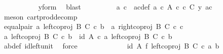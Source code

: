 \begin{isabellebody}
\ \ \ \ \ \ \ \ \isamarkupfalse%
\ \ y{\isacharunderscore}{\kern0pt}form\ \isamarkupfalse%
\ blast\isanewline
\ \ \ \ \ \ \isamarkupfalse%
\ \isamarkupfalse%
\ a{\isacharprime}{\kern0pt}\ c{\isacharprime}{\kern0pt}\ \ a{\isacharprime}{\kern0pt}c{\isacharprime}{\kern0pt}{\isacharunderscore}{\kern0pt}def{\isacharcolon}{\kern0pt}\ {\isachardoublequoteopen}a{\isacharprime}{\kern0pt}\ {\isasymin}\isactrlsub c\ A{\isachardoublequoteclose}\ {\isachardoublequoteopen}c{\isacharprime}{\kern0pt}\ {\isasymin}\isactrlsub c\ C{\isachardoublequoteclose}\ {\isachardoublequoteopen}y{\isacharprime}{\kern0pt}\ {\isacharequal}{\kern0pt}{\isasymlangle}a{\isacharprime}{\kern0pt}{\isacharcomma}{\kern0pt}c{\isacharprime}{\kern0pt}{\isasymrangle}{\isachardoublequoteclose}\isanewline
\ \ \ \ \ \ \ \ \isamarkupfalse%
\ {\isacharparenleft}{\kern0pt}meson\ cart{\isacharunderscore}{\kern0pt}prod{\isacharunderscore}{\kern0pt}decomp{\isacharparenright}{\kern0pt}\isanewline
\ \ \ \ \ \ \isamarkupfalse%
\ equal{\isacharunderscore}{\kern0pt}pair{\isacharcolon}{\kern0pt}\ {\isachardoublequoteopen}{\isasymlangle}a{\isacharcomma}{\kern0pt}\ {\isacharparenleft}{\kern0pt}left{\isacharunderscore}{\kern0pt}coproj\ B\ C{\isacharparenright}{\kern0pt}\ {\isasymcirc}\isactrlsub c\ b{\isasymrangle}\ {\isacharequal}{\kern0pt}\ {\isasymlangle}a{\isacharprime}{\kern0pt}{\isacharcomma}{\kern0pt}\ right{\isacharunderscore}{\kern0pt}coproj\ B\ C\ {\isasymcirc}\isactrlsub c\ c{\isacharprime}{\kern0pt}{\isasymrangle}{\isachardoublequoteclose}\isanewline
\ \ \ \ \ \ \isamarkupfalse%
\ {\isacharminus}{\kern0pt}\ \isanewline
\ \ \ \ \ \ \ \ \isamarkupfalse%
\ {\isachardoublequoteopen}{\isasymlangle}a{\isacharcomma}{\kern0pt}\ left{\isacharunderscore}{\kern0pt}coproj\ B\ C\ {\isasymcirc}\isactrlsub c\ b{\isasymrangle}\ {\isacharequal}{\kern0pt}\ {\isasymlangle}id\ A\ {\isasymcirc}\isactrlsub c\ a{\isacharcomma}{\kern0pt}\ left{\isacharunderscore}{\kern0pt}coproj\ B\ C\ {\isasymcirc}\isactrlsub c\ b{\isasymrangle}{\isachardoublequoteclose}\isanewline
\ \ \ \ \ \ \ \ \ \ \isamarkupfalse%
\ ab{\isacharunderscore}{\kern0pt}def\ id{\isacharunderscore}{\kern0pt}left{\isacharunderscore}{\kern0pt}unit{}\ \isamarkupfalse%
\ force\isanewline
\ \ \ \ \ \ \ \ \isamarkupfalse%
\ \isamarkupfalse%
\ {\isachardoublequoteopen}{\isachardot}{\kern0pt}{\isachardot}{\kern0pt}{\isachardot}{\kern0pt}\ {\isacharequal}{\kern0pt}\ {\isacharparenleft}{\kern0pt}id\ A\ {\isasymtimes}\isactrlsub f\ left{\isacharunderscore}{\kern0pt}coproj\ B\ C{\isacharparenright}{\kern0pt}\ {\isasymcirc}\isactrlsub c\ {\isasymlangle}a{\isacharcomma}{\kern0pt}\ b{\isasymrangle}{\isachardoublequoteclose}\isanewline

\end{isabellebody}
